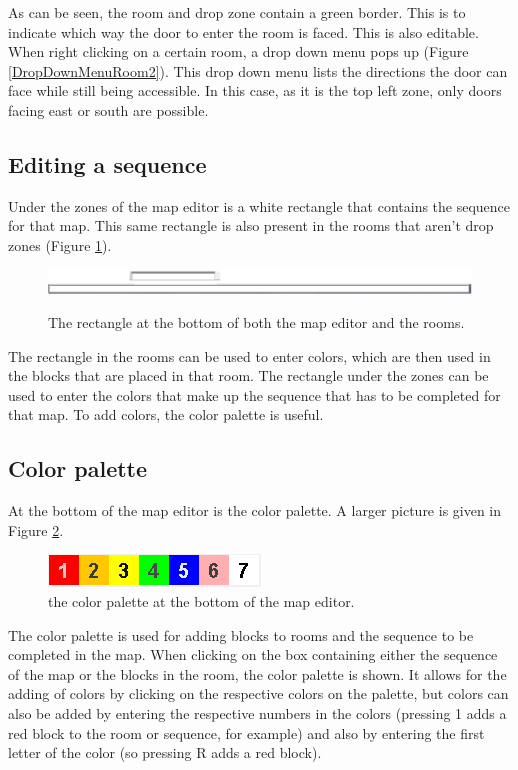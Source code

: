 As can be seen, the room and drop zone contain a green border. This is to indicate which way the door to enter the room is faced. This is also editable. When right clicking on a certain room, a drop down menu pops up (Figure \ref{DropDownMenuRoom2}). This drop down menu lists the directions the door can face while still being accessible. In this case, as it is the top left zone, only doors facing east or south are possible.




\subsection{Editing a sequence}
Under the zones of the map editor is a white rectangle that contains the sequence for that map. This same rectangle is also present in the rooms that aren't drop zones (Figure \ref{fig:SequenceEditor}).

\begin{figure}
	\center
	\includegraphics[scale=0.5]{EnvironmentStore/SequenceEditor.png}\\
	\caption{The rectangle at the bottom of both the map editor and the rooms.}\label{fig:SequenceEditor}
\end{figure}

The rectangle in the rooms can be used to enter colors, which are then used in the blocks that are placed in that room. The rectangle under the zones can be used to enter the colors that make up the sequence that has to be completed for that map. To add colors, the color palette is useful.
\subsection{Color palette}
At the bottom of the map editor is the color palette. A larger picture is given in Figure \ref{fig:ColorPalette}.

\begin{figure}[h!]
	\center
	\includegraphics{EnvironmentStore/ColorPalette.png}
	\caption{the color palette at the bottom of the map editor.}
	\label{fig:ColorPalette}
\end{figure}



The color palette is used for adding blocks to rooms and the sequence to be completed in the map. When clicking on the box containing either the sequence of the map or the blocks in the room, the color palette is shown. It allows for the adding of colors by clicking on the respective colors on the palette, but colors can also be added by entering the respective numbers in the colors (pressing 1 adds a red block to the room or sequence, for example) and also by entering the first letter of the color (so pressing R adds a red block).

